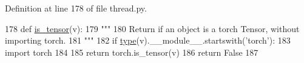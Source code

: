 Definition at line 178 of file thread.\+py.


\begin{DoxyCode}
178 \textcolor{keyword}{def }\hyperlink{namespaceparlai_1_1utils_1_1thread_ad2b01da95ecdc33d8dce76a79f48137f}{is\_tensor}(v):
179     \textcolor{stringliteral}{"""}
180 \textcolor{stringliteral}{    Return if an object is a torch Tensor, without importing torch.}
181 \textcolor{stringliteral}{    """}
182     \textcolor{keywordflow}{if} \hyperlink{namespaceparlai_1_1agents_1_1tfidf__retriever_1_1build__tfidf_ad5dfae268e23f506da084a9efb72f619}{type}(v).\_\_module\_\_.startswith(\textcolor{stringliteral}{'torch'}):
183         \textcolor{keyword}{import} torch
184 
185         \textcolor{keywordflow}{return} torch.is\_tensor(v)
186     \textcolor{keywordflow}{return} \textcolor{keyword}{False}
187 \end{DoxyCode}
